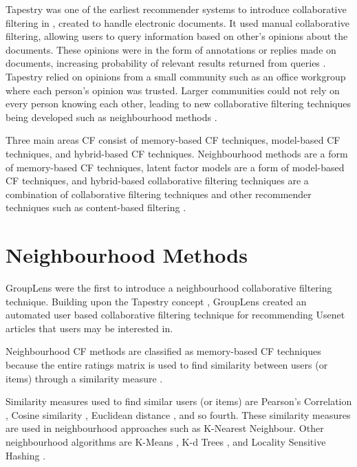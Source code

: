 Tapestry \cite{koren2009matrix,  goldberg1992using, itembased, survey} was one of the earliest recommender systems to introduce collaborative filtering in \citeyear{goldberg1992using}, created to handle electronic documents. It used manual collaborative filtering, allowing users to query information based on other's opinions about the documents. These opinions were in the form of annotations or replies made on documents, increasing probability of relevant results returned from queries \cite{schafer2007collaborative}. Tapestry relied on opinions from a small community such as an office workgroup where each person's opinion was trusted. Larger communities could not rely on every person knowing each other, leading to new collaborative filtering techniques being developed such as neighbourhood methods \cite{itembased}. 

Three main areas CF consist of memory-based CF techniques, model-based CF techniques, and hybrid-based CF techniques. Neighbourhood methods are a form of memory-based CF techniques, latent factor models are a form of model-based CF techniques, and hybrid-based collaborative filtering techniques are a combination of collaborative filtering techniques and other recommender techniques such as content-based filtering \cite{survey, koren2009matrix}.

\section{Neighbourhood Methods}

GroupLens \cite{grouplens} were the first to introduce a neighbourhood collaborative filtering technique. Building upon the Tapestry concept \cite{goldberg1992using}, GroupLens created an automated user based collaborative filtering technique for recommending Usenet articles that users may be interested in. 

Neighbourhood CF methods are classified as memory-based CF techniques because the entire ratings matrix is used to find similarity between users (or items) through a similarity measure \cite{memorybased, schafer2007collaborative}. 

Similarity measures used to find similar users (or items) are Pearson's Correlation \cite{zeng2003similarity, itembased, mahoutaction}, Cosine similarity \cite{itembased}, Euclidean distance \cite{similarity, mahoutaction}, and so fourth. These similarity measures are used in neighbourhood approaches such as K-Nearest Neighbour. Other neighbourhood algorithms are K-Means \cite{survey}, K-d Trees \cite{survey}, and Locality Sensitive Hashing \cite{survey}. 

